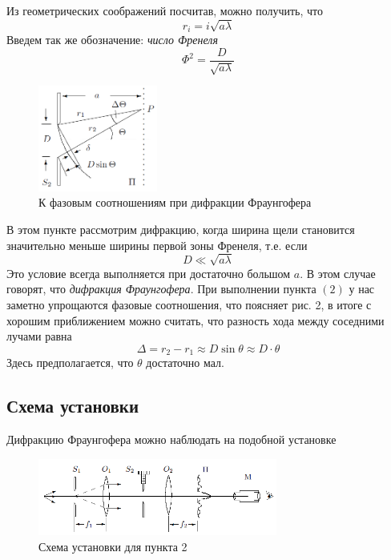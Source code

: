 \documentclass[a4paper, 12pt]{article}%
\begin{document}
Из геометрических соображений посчитав, можно получить, что
\begin{equation}
r_i = i \sqrt{a \lambda}
\end{equation}
Введем так же обозначение: \textit{число Френеля}
\begin{equation}
\Phi^2 = \dfrac{D}{\sqrt{a\lambda}}
\end{equation}
\begin{figure}
  \begin{center}
    \includegraphics[width = 0.35\textwidth]{1.png}
  \end{center}
  \caption{К фазовым соотношениям при дифракции Фраунгофера}
\end{figure}
В этом пункте рассмотрим дифракцию, когда ширина щели становится значительно меньше ширины первой зоны Френеля, т.е. если
\begin{equation}
D \ll\sqrt{a \lambda}
\end{equation}
Это условие всегда выполняется при достаточно большом $a$. В этом случае говорят, что \textit{дифракция Фраунгофера}. При выполнении пункта $(2)$ у нас заметно упрощаются фазовые соотношения, что поясняет рис. 2, в итоге с хорошим приближением можно считать, что разность хода между соседними лучами равна
\begin{equation}
\Delta = r_2 - r_1 \approx D \sin \theta \approx D \cdot \theta
\end{equation}
Здесь предполагается, что $\theta$ достаточно мал.

\subsection*{Схема установки}
Дифракцию Фраунгофера можно наблюдать на подобной установке

\begin{figure}[h]
\begin{center}
\includegraphics[width = 0.7\textwidth]{3.png}
\caption{Схема установки для пункта 2}
\end{center}
\end{figure}
\end{document}
